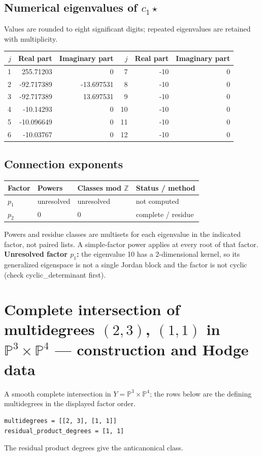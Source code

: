 \documentclass[10pt,a4paper]{article}
\begin{document}
\subsection*{Numerical eigenvalues of $c_1\star$}
Values are rounded to eight significant digits; repeated eigenvalues are retained with multiplicity.
\begin{center}\small\begin{tabular}{rrr@{\qquad}rrr}\toprule $j$ & Real part & Imaginary part & $j$ & Real part & Imaginary part\\\midrule
1 & 255.71203 & 0 & 7 & -10 & 0\\
2 & -92.717389 & -13.697531 & 8 & -10 & 0\\
3 & -92.717389 & 13.697531 & 9 & -10 & 0\\
4 & -10.14293 & 0 & 10 & -10 & 0\\
5 & -10.096649 & 0 & 11 & -10 & 0\\
6 & -10.03767 & 0 & 12 & -10 & 0\\
\bottomrule\end{tabular}\end{center}
\subsection*{Connection exponents}
\begin{center}\begin{tabular}{llll}\toprule Factor & Powers & Classes mod $\mathbb Z$ & Status / method\\\midrule
$p_{1}$ & unresolved & unresolved & not computed\\
$p_{2}$ & $0$ & $0$ & complete / residue\\
\bottomrule\end{tabular}\end{center}
Powers and residue classes are multisets for each eigenvalue in the indicated factor, not paired lists. A simple-factor power applies at every root of that factor.
\textbf{Unresolved factor $p_{1}$:} the eigenvalue 10 has a 2-dimensional kernel, so its generalized eigenspace is not a single Jordan block and the factor is not cyclic (check cyclic\_determinant first).
\clearpage\section*{Complete intersection of multidegrees $(2,3)$, $(1,1)$ in $\mathbb P^{3}\times \mathbb P^{4}$ --- construction and Hodge data}\label{entry:PROD5-D03}
A smooth complete intersection in $Y=\mathbb P^{3}\times\mathbb P^{4}$; the rows below are the defining multidegrees in the displayed factor order.
\begin{lstlisting}
multidegrees = [[2, 3], [1, 1]]
residual_product_degrees = [1, 1]
\end{lstlisting}
The residual product degrees give the anticanonical class.
\end{document}
